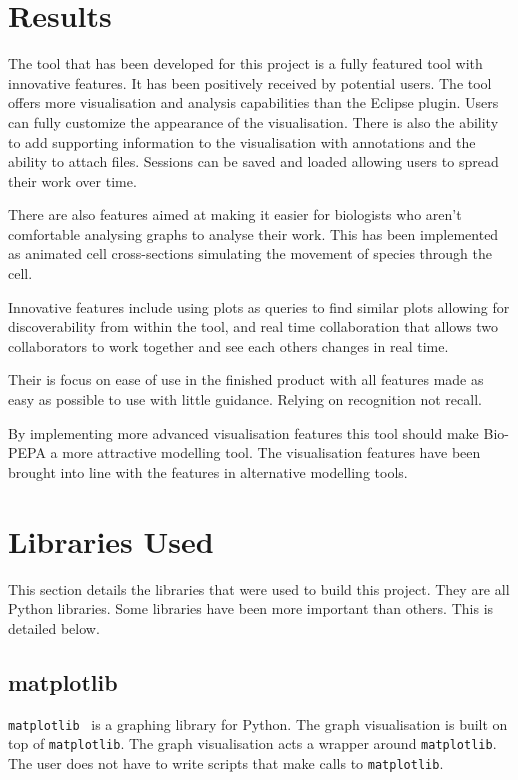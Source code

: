 \section{Results}

The tool that has been developed for this project is a fully featured tool with innovative features.  It has been positively received by potential users.
The tool offers more visualisation and analysis capabilities than the Eclipse plugin.  Users can fully customize the appearance of the visualisation.  There is also the ability to add supporting information to the visualisation with annotations and the ability to attach files.  Sessions can be saved and loaded allowing users to spread their work over time.

There are also features aimed at making it easier for biologists who aren't comfortable analysing graphs to analyse their work.  This has been implemented as animated cell cross-sections simulating the movement of species through the cell.

Innovative features include using plots as queries to find similar plots allowing for discoverability from within the tool, and real time collaboration that allows two collaborators to work together and see each others changes in real time.

Their is focus on ease of use in the finished product with all features made as easy as possible to use with little guidance.  Relying on recognition not recall.

By implementing more advanced visualisation features this tool should make Bio-PEPA a more attractive modelling tool. The visualisation features have been brought into line with the features in alternative modelling tools.

\section{Libraries Used}

This section details the libraries that were used to build this project.  They are all Python libraries.  Some libraries have been more important than others.  This is detailed below.

\subsection{matplotlib}

\texttt{matplotlib}~\cite{mpl} is a graphing library for Python.  The graph visualisation is built on top of \texttt{matplotlib}.  The graph visualisation acts a wrapper around \texttt{matplotlib}.  The user does not have to write scripts that make calls to \texttt{matplotlib}.


